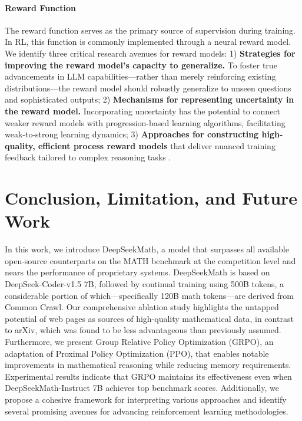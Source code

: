 \begin{itemize}[topsep=0pt]
\begin{itemize}[topsep=0pt]
\paragraph{Reward Function} The reward function serves as the primary source of supervision during training. In RL, this function is commonly implemented through a neural reward model. We identify three critical research avenues for reward models: 1) \textbf{Strategies for improving the reward model’s capacity to generalize.} To foster true advancements in LLM capabilities—rather than merely reinforcing existing distributions—the reward model should robustly generalize to unseen questions and sophisticated outputs; 2) \textbf{Mechanisms for representing uncertainty in the reward model.} Incorporating uncertainty has the potential to connect weaker reward models with progression-based learning algorithms, facilitating weak-to-strong learning dynamics; 3) \textbf{Approaches for constructing high-quality, efficient process reward models} that deliver nuanced training feedback tailored to complex reasoning tasks \citep{lightman2023let,wang2023math}.

\section{Conclusion, Limitation, and Future Work}

In this work, we introduce DeepSeekMath, a model that surpasses all available open-source counterparts on the MATH benchmark at the competition level and nears the performance of proprietary systems. DeepSeekMath is based on DeepSeek-Coder-v1.5 7B, followed by continual training using 500B tokens, a considerable portion of which—specifically 120B math tokens—are derived from Common Crawl. Our comprehensive ablation study highlights the untapped potential of web pages as sources of high-quality mathematical data, in contrast to arXiv, which was found to be less advantageous than previously assumed. Furthermore, we present Group Relative Policy Optimization (GRPO), an adaptation of Proximal Policy Optimization (PPO), that enables notable improvements in mathematical reasoning while reducing memory requirements. Experimental results indicate that GRPO maintains its effectiveness even when DeepSeekMath-Instruct 7B achieves top benchmark scores. Additionally, we propose a cohesive framework for interpreting various approaches and identify several promising avenues for advancing reinforcement learning methodologies.


\end{itemize}
\end{itemize}
